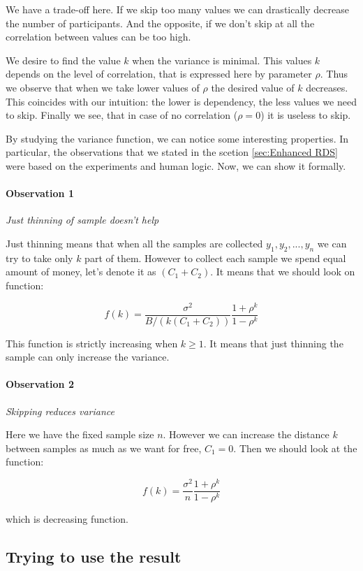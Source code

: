 \documentclass[12pt]{report}
\newcommand\myworries[1]{\textcolor{red}{#1}}
\renewcommand\myworries[1]{}
\begin{document}
We have a trade-off here. If we skip too many values we can drastically decrease the number of participants. And the opposite, if we don't skip at all the correlation between values can be too high. 

We desire to find the value $k$ when the variance is minimal. This values $k$ depends on the level of correlation, that is expressed here by parameter $\rho$. Thus we observe that when we take lower values of $\rho$ the desired value of $k$ decreases. This coincides with our intuition: the lower is dependency, the less values we need to skip. Finally we see, that in case of no correlation ($\rho = 0$) it is useless to skip.
 
By studying the variance function, we can notice some interesting properties. In particular, the observations that we stated in the scetion \ref{sec:Enhanced RDS} were based on the experiments and human logic. Now, we can show it formally.

\paragraph{Observation 1} \textit{Just thinning of sample doesn't help}

Just thinning means that when all the samples are collected $y_1, y_2, ...,y_n$ we can try to take only $k$ part of them. However to collect each sample we spend equal amount of money, let's denote it as $(C_1+C_2)$. It means that we should look on function:

$$ f(k) = \frac{\sigma^2}{B/(k(C_1 + C_2))} \frac{1+\rho^{k}}{1-\rho^{k}}$$

This function is strictly increasing when $k \geq 1$. It means that just thinning the sample can only increase the variance. 

\myworries{put the proof in the appendix}

\paragraph{Observation 2} \textit{Skipping reduces variance}

Here we have the fixed sample size $n$. However we can increase the distance $k$ between samples as much as we want for free, $C_1 = 0$. Then we should look at the function:

$$ f(k) = \frac{\sigma^2}{n} \frac{1+\rho^{k}}{1-\rho^{k}}$$

which is decreasing function.

\subsection{Trying to use the result}
\end{document}
